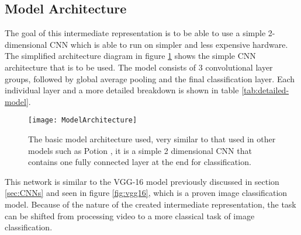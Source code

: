 \subsection{Model Architecture}

The goal of this intermediate representation is to be able to use a simple 2-dimensional CNN which is able to run on simpler and less expensive hardware. The simplified architecture diagram in figure \ref{fig:model-architecture} shows the simple CNN architecture that is to be used. The model consists of 3 convolutional layer groups, followed by global average pooling and the final classification layer. Each individual layer and a more detailed breakdown is shown in table \ref{tab:detailed-model}. 

\begin{figure}[ht]
	\texttt{[image: ModelArchitecture]}
	\centering
	\caption{The basic model architecture used, very similar to that used in other models such as Potion \cite{potion}, it is a simple 2 dimensional CNN that contains one fully connected layer at the end for classification.}
	\label{fig:model-architecture}
\end{figure}

This network is similar to the VGG-16 model previously discussed in section \ref{sec:CNNs} and seen in figure \ref{fig:vgg16}, which is a proven image classification model. Because of the nature of the created intermediate representation, the task can be shifted from processing video to a more classical task of image classification.

